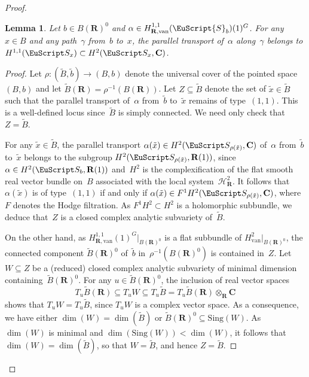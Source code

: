 \documentclass[JEP,XML,SOM,Unicode]{cedram}
\let\mathcal\EuScript
\theoremstyle{plain}
\newtheorem{lem}[thm]{Lemma}
\theoremstyle{definition}
\numberwithin{equation}{section}
\newcommand{\sH}{{\mathscr H}}
\renewcommand{\C}{{\mathbf C}}
\newcommand{\R}{{\mathbf R}}
\newcommand{\van}{\mathrm{van}}
\newcommand{\Sing}{\mathrm{Sing}}
\begin{document}
\begin{proof}
\begin{lem}
\label{lem:parallel transport}
Let $b \in B(\R)^0$
and $\alpha\in H_{\R,\van}^{1,1}(\mathcal{S}_b)(1)^G$.
For any $x \in B$ and any path~$\gamma$ from~$b$ to~$x$, the parallel transport
of~$\alpha$ along~$\gamma$ belongs to $H^{1,1}(\mathcal S_x) \subset H^2(\mathcal S_x,\C)$.
\end{lem}

\begin{proof}
Let $\rho:(\widetilde{B},\widetilde{b})\to (B,b)$
denote the universal cover of the pointed space~$(B,b)$ and let $\widetilde{B}(\R)=\rho^{-1}(B(\R))$.
Let $Z\subseteq\widetilde{B}$ denote the set of $\tilde{x} \in \widetilde{B}$
such that the parallel transport of~$\alpha$ from~$\tilde{b}$ to~$\tilde{x}$ remains of type~$(1,1)$.
This is
a well-defined locus since~$\widetilde{B}$ is simply connected.
We need only check that $Z=\widetilde{B}$.

For any $\tilde{x} \in \widetilde{B}$, the parallel transport
$\alpha(\tilde{x})\in H^2(\mathcal S_{\rho(\tilde{x})},\C)$ of~$\alpha$
from~$\tilde{b}$ to~$\tilde{x}$ belongs to the subgroup $H^2(\mathcal S_{\rho(\tilde{x})},\R(1))$,
since $\alpha\in H^2(\mathcal S_b,\R(1))$
and~$H^2$ is the complexification of the flat smooth real vector bundle on~$B$
associated with the local system~$\sH^2_\R$.
It follows that~$\alpha(\tilde{x})$ is of type~$(1,1)$ if and only if $\alpha(\tilde{x})\in F^1H^2(\mathcal S_{\rho(\tilde{x})},\C)$, where~$F$ denotes the Hodge filtration.
As $F^1 H^2 \subset H^2$ is a holomorphic subbundle,
we deduce that~$Z$ is a closed complex analytic subvariety of~$\widetilde{B}$.

On the other hand, as
$H^{1,1}_{\R,\van}(1)^G|_{B(\R)^0}$
is a flat subbundle of $H^2_{\van}|_{B(\R)^0}$,
the connected component
$\widetilde{B}(\R)^0$
of~$\tilde{b}$ in~$\rho^{-1}(B(\R)^0)$
is contained in~$Z$.
Let $W \subseteq Z$ be a (reduced) closed complex analytic subvariety of minimal dimension
containing~$\widetilde{B}(\R)^0$.
For any $u \in \widetilde{B}(\R)^0$, the inclusion of real vector spaces
\[
T_u\widetilde{B}(\R) \subseteq T_u W \subseteq T_u \widetilde{B}=T_u\widetilde{B}(\R)\otimes_\R\C
\]
shows that $T_uW=T_u\widetilde{B}$,
since $T_uW$ is a complex vector space.
As a consequence, we have either $\dim(W)=\dim(\widetilde{B})$ or
$\widetilde{B}(\R)^0 \subseteq \Sing(W)$.
As~$\dim(W)$ is minimal and $\dim(\Sing(W))<\dim(W)$, it follows
that $\dim(W)=\dim(\widetilde{B})$, so that $W=\widetilde{B}$, and hence $Z=\widetilde{B}$.
\end{proof}


\end{proof}
\end{document}
